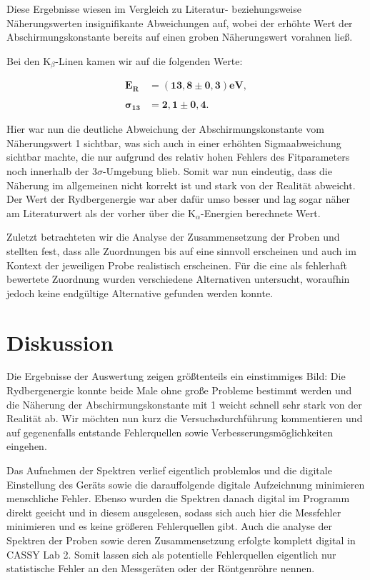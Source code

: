 \documentclass{article}
\begin{document}
Diese Ergebnisse wiesen im Vergleich zu Literatur- beziehungsweise Näherungswerten insignifikante Abweichungen auf, wobei der erhöhte Wert der Abschirmungskonstante bereits auf einen groben Näherungswert vorahnen ließ.

Bei den K$_\beta$-Linen kamen wir auf die folgenden Werte:

\begin{equation}
    \begin{split}
        \bm{E_R} &\bm{= (13,8 \pm 0,3)} \textbf{eV}, \\ \\
        \bm{\sigma_{13}} &\bm{= 2,1 \pm 0,4}.
    \end{split}
\end{equation}

Hier war nun die deutliche Abweichung der Abschirmungskonstante vom Näherungswert 1 sichtbar, was sich auch in einer erhöhten Sigmaabweichung sichtbar machte, die nur aufgrund des relativ hohen Fehlers des Fitparameters noch innerhalb der $3\sigma$-Umgebung blieb. Somit war nun eindeutig, dass die Näherung im allgemeinen nicht korrekt ist und stark von der Realität abweicht. Der Wert der Rydbergenergie war aber dafür umso besser und lag sogar näher am Literaturwert als der vorher über die K$_\alpha$-Energien berechnete Wert. 

Zuletzt betrachteten wir die Analyse der Zusammensetzung der Proben und stellten fest, dass alle Zuordnungen bis auf eine sinnvoll erscheinen und auch im Kontext der jeweiligen Probe realistisch erscheinen. Für die eine als fehlerhaft bewertete Zuordnung wurden verschiedene Alternativen untersucht, woraufhin jedoch keine endgültige Alternative gefunden werden konnte.   


\newpage
\section{Diskussion}

Die Ergebnisse der Auswertung zeigen größtenteils ein einstimmiges Bild: Die Rydbergenergie konnte beide Male ohne große Probleme bestimmt werden und die Näherung der Abschirmungskonstante mit 1 weicht schnell sehr stark von der Realität ab. Wir möchten nun kurz die Versuchsdurchführung kommentieren und auf gegenenfalls entstande Fehlerquellen sowie Verbesserungsmöglichkeiten eingehen.

Das Aufnehmen der Spektren verlief eigentlich problemlos und die digitale Einstellung des Geräts sowie die darauffolgende digitale Aufzeichnung minimieren menschliche Fehler. Ebenso wurden die Spektren danach digital im Programm direkt geeicht und in diesem ausgelesen, sodass sich auch hier die Messfehler minimieren und es keine größeren Fehlerquellen gibt. Auch die analyse der Spektren der Proben sowie deren Zusammensetzung erfolgte komplett digital in CASSY Lab 2. Somit lassen sich als potentielle Fehlerquellen eigentlich nur statistische Fehler an den Messgeräten oder der Röntgenröhre nennen. 
\end{document}
